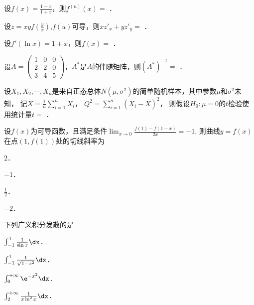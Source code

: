\documentclass[plain,noanswer,medmath]{../../template/jnuexam}
\begin{document}




\begin{problem}
设$f(x) = \frac{1 - x}{1 + x}$，则$f^{(n)}(x) =$ \fillin{}．
\end{problem}


\begin{problem}
设$z = xyf\left(\frac{y}{x} \right)$,$f(u)$可导，则$xz'_x + yz'_y =$ \fillin{}．
\end{problem}


\begin{problem}
设$f'(\ln x) = 1 + x$，则$f(x) =$ \fillin{}．
\end{problem}


\begin{problem}
设$A = \begin{pmatrix}
  1 & 0 & 0 \\
  2 & 2 & 0 \\
  3 & 4 & 5
\end{pmatrix}$，$A^*$是$A$的伴随矩阵，则$(A^*)^{-1} =$ \fillin{}．
\end{problem}


\begin{problem}
设$X_1,X_2, \cdots ,X_n$是来自正态总体$N(\mu ,\sigma^2)$的简单随机样本，其中参数$\mu$和$\sigma^2$未知，
记$\overline{X}= \frac{1}{n}\sum_{i = 1}^n X_i^{}$，
$Q^2 = \sum_{i = 1}^n (X_i^{} - \overline{X})^2$，
则假设$H_0:\mu = 0$的$t$检验使用统计量$t =$ \fillin{}．
\end{problem}




\begin{problem}
设$f(x)$为可导函数，且满足条件$\lim_{x \to 0} \frac{f(1) - f(1 - x)}{2x} = - 1$,
则曲线$y = f(x)$在点$(1,f(1))$处的切线斜率为\pickout{}
\begin{abcd}
\item $2$．         
\item $- 1$．         
\item $\frac{1}{2}$．         
\item $- 2$．
\end{abcd}
\end{problem}


\begin{problem}
下列广义积分发散的是\pickout{}
\begin{abcd}
\item $\int_{-1}^1\frac{1}{\sin x}\dx$．
\item $\int_{-1}^1\frac{1}{\sqrt{1 - x^2}}\dx$．
\item $\int_0^{+\infty} \e^{- x^2} \dx$．
\item $\int_2^{+\infty} \frac{1}{x\ln^2 x} \dx$．
\end{abcd}
\end{problem}
\end{document}

